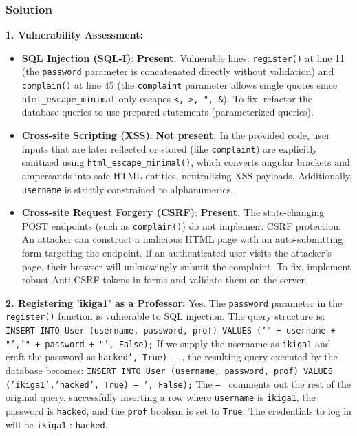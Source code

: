 \documentclass{article}
\begin{document}
\subsubsection*{Solution}
\textbf{1. Vulnerability Assessment:}
\begin{itemize}
    \item \textbf{SQL Injection (SQL-I)}: \textbf{Present.} Vulnerable lines: \texttt{register()} at line 11 (the \texttt{password} parameter is concatenated directly without validation) and \texttt{complain()} at line 45 (the \texttt{complaint} parameter allows single quotes since \texttt{html\_escape\_minimal} only escapes \texttt{<, >, ", \&}). To fix, refactor the database queries to use prepared statements (parameterized queries).
    \item \textbf{Cross-site Scripting (XSS)}: \textbf{Not present.} In the provided code, user inputs that are later reflected or stored (like \texttt{complaint}) are explicitly sanitized using \texttt{html\_escape\_minimal()}, which converts angular brackets and ampersands into safe HTML entities, neutralizing XSS payloads. Additionally, \texttt{username} is strictly constrained to alphanumerics.
    \item \textbf{Cross-site Request Forgery (CSRF)}: \textbf{Present.} The state-changing POST endpoints (such as \texttt{complain()}) do not implement CSRF protection. An attacker can construct a malicious HTML page with an auto-submitting form targeting the endpoint. If an authenticated user visits the attacker's page, their browser will unknowingly submit the complaint. To fix, implement robust Anti-CSRF tokens in forms and validate them on the server.

\end{itemize}
\textbf{2. Registering 'ikiga1' as a Professor:}
Yes. The \texttt{password} parameter in the \texttt{register()} function is vulnerable to SQL injection. The query structure is:
\texttt{INSERT INTO User (username, password, prof) VALUES ('" + username + "','" + password + "', False);}
If we supply the username as \texttt{ikiga1} and craft the password as \texttt{hacked', True) -- }, the resulting query executed by the database becomes:
\texttt{INSERT INTO User (username, password, prof) VALUES ('ikiga1','hacked', True) -- ', False);}
The \texttt{-- } comments out the rest of the original query, successfully inserting a row where \texttt{username} is \texttt{ikiga1}, the password is \texttt{hacked}, and the \texttt{prof} boolean is set to \texttt{True}. The credentials to log in will be \texttt{ikiga1} : \texttt{hacked}.
\end{document}
